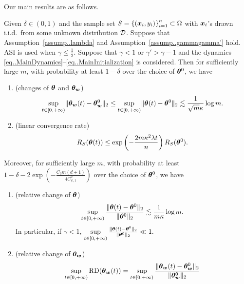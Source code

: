 \documentclass{article}
\begin{document}
Our main results are as follows.
\begin{thm}\label{thm..LinearRegime}
    Given $\delta\in(0,1)$ and the sample set $S = {\{(\bm{x}_i, y_i)\}}_{i=1}^n\subset\Omega$ with $\bm{x}_i$'s drawn i.i.d.\ from some unknown distribution $\mathcal{D}$. Suppose that Assumption~\ref{assump..lambda} and Assumption~\ref{assump..gammagamma'} hold. ASI is used when $\gamma\leq\frac{1}{2}$. Suppose that $\gamma<1$ or $\gamma'>\gamma-1$ and the dynamics \eqref{eq..MainDynamics}--\eqref{eq..MainInitialization} is considered. Then for sufficiently large $m$, with probability at least $1-\delta$ over the choice of $\bm{\theta}^0$, we have
    \begin{enumerate}[label=(\alph*)]
        \item (changes of $\bm{\theta}$ and $\bm{\theta}_{\bm{w}}$)
              \begin{equation}
                  \sup\limits_{t\in[0,+\infty)}\lVert\bm{\theta}_{\bm{w}}(t)-\bm{\theta}_{\bm{w}}^0\rVert_2\leq \sup\limits_{t\in[0,+\infty)}\lVert\bm{\theta}(t)-\bm{\theta}^0\rVert_2\lesssim\frac{1}{\sqrt{m}\kappa}\log m.
              \end{equation}
        \item (linear convergence rate)
              \begin{equation}
                  R_S(\bm{\theta}(t))\leq \exp\left(-\frac{2m\kappa^2\lambda t}{n}\right)R_S(\bm{\theta}^0).
              \end{equation}
    \end{enumerate}
    Moreover, for sufficiently large $m$, with probability at least $1-\delta-2\exp\left(-\frac{C_0m(d+1)}{4C^2_{\psi,1}}\right)$ over the choice of $\bm{\theta}^0$, we have
    \begin{enumerate}[resume*]
        \item (relative change of $\bm{\theta}$)
              \begin{equation}
                  \sup\limits_{t\in[0,+\infty)}\frac{\lVert\bm{\theta}(t)-\bm{\theta}^0\rVert_2}{\lVert\bm{\theta}^0\rVert_2}\lesssim\frac{1}{m\kappa}\log m.
              \end{equation}
              In particular, if $\gamma<1$, $\sup\limits_{t\in[0,+\infty)}\frac{\lVert\bm{\theta}(t)-\bm{\theta}^0\rVert_2}{\lVert\bm{\theta}^0\rVert_2}\ll 1.$
        \item (relative change of $\bm{\theta}_{\bm{w}}$)
              \begin{equation}
                  \sup\limits_{t\in[0,+\infty)}\mathrm{RD}(\vtheta_{\vw}(t))=\sup\limits_{t\in[0,+\infty)}\frac{\norm{\vtheta_{\vw}(t)-\vtheta_{\vw}^0}_2}{\norm{\vtheta_{\vw}^0}_2}

\end{equation}
\end{enumerate}
\end{thm}
\end{document}
